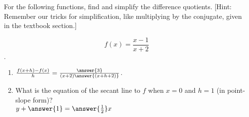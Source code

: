 \documentclass{ximera}
\author{Elizabeth Campolongo}
\begin{document}
\begin{exercise}

For the following functions, 
find and simplify the difference quotients. [Hint: Remember our tricks for simplification, like multiplying by the conjugate, given in the textbook section.]

$$f(x)= \frac{x-1}{x+2}$$.

\begin{enumerate}

\item $\frac{f(x+h)-f(x)}{h} = \frac{\answer{3}}{(x+2)\answer{(x+h+2)}}$.  

\item What is the equation of the secant line to $f$ when $x = 0$ and $h=1$ (in point-slope form)?\\
$y+ \answer{1} = \answer{\frac{1}{2}}x$
	
\end{enumerate}
\end{exercise}
\end{document}
